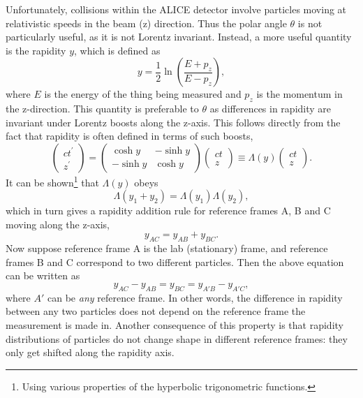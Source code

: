 Unfortunately, collisions within the ALICE detector involve particles moving at relativistic speeds in the beam (z) direction. Thus the polar angle $\theta$ is not particularly useful, as it is not Lorentz invariant. Instead, a more useful quantity is the rapidity $y$, which is defined as
\begin{equation}
    y = \frac{1}{2} \ln \left( \frac{E + p_{z}}{E - p_{z}} \right),
\end{equation}
where $E$ is the energy of the thing being measured and $p_{z}$ is the momentum in the z-direction. This quantity is preferable to $\theta$ as differences in rapidity are invariant under Lorentz boosts along the z-axis. This follows directly from the fact that rapidity is often defined in terms of such boosts,
\begin{equation}
    \left(\begin{array}{c}
        c t^{\prime} \\
        z^{\prime}
        \end{array}\right)=\left(\begin{array}{cc}
        \cosh y & -\sinh y \\
        -\sinh y & \cosh y
        \end{array}\right)\left(\begin{array}{c}
        c t \\
        z
        \end{array}\right) \equiv \Lambda(y)\left(\begin{array}{c}
        c t \\
        z
        \end{array}\right).
\end{equation}
It can be shown\footnote{Using various properties of the hyperbolic trigonometric functions.} that $\Lambda(y)$ obeys
\begin{equation}
    \Lambda(y_1 + y_2) = \Lambda(y_1)\Lambda(y_2),
\end{equation}
which in turn gives a rapidity addition rule for reference frames A, B and C moving along the z-axis,
\begin{equation}
    y_{AC} = y_{AB} + y_{BC}.
\end{equation}
Now suppose reference frame A is the lab (stationary) frame, and reference frames B and C correspond to two different particles. Then the above equation can be written as
\begin{equation}
    y_{AC} - y_{AB} = y_{BC} = y_{A'B} - y_{A'C},
\end{equation}
where $A'$ can be \textit{any} reference frame. In other words, the difference in rapidity between any two particles does not depend on the reference frame the measurement is made in. Another consequence of this property is that rapidity distributions of particles do not change shape in different reference frames: they only get shifted along the rapidity axis.

